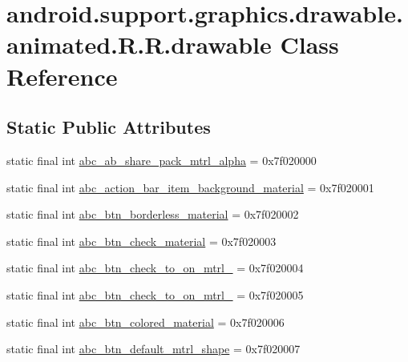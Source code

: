 \hypertarget{classandroid_1_1support_1_1graphics_1_1drawable_1_1animated_1_1_r_1_1drawable}{
\section{android.support.graphics.drawable.animated.R.R.drawable Class Reference}
\label{classandroid_1_1support_1_1graphics_1_1drawable_1_1animated_1_1_r_1_1drawable}
}
\subsection*{Static Public Attributes}
\begin{CompactItemize}
\item 
static final int \hyperlink{classandroid_1_1support_1_1graphics_1_1drawable_1_1animated_1_1_r_1_1drawable_05d8125d7b1434895dd1d589215a8d37}{abc\_\-ab\_\-share\_\-pack\_\-mtrl\_\-alpha} = 0x7f020000
\item 
static final int \hyperlink{classandroid_1_1support_1_1graphics_1_1drawable_1_1animated_1_1_r_1_1drawable_e00a2e7bcb2b10d7ad898217cd821020}{abc\_\-action\_\-bar\_\-item\_\-background\_\-material} = 0x7f020001
\item 
static final int \hyperlink{classandroid_1_1support_1_1graphics_1_1drawable_1_1animated_1_1_r_1_1drawable_3c31666387fd30b884066c7438704a57}{abc\_\-btn\_\-borderless\_\-material} = 0x7f020002
\item 
static final int \hyperlink{classandroid_1_1support_1_1graphics_1_1drawable_1_1animated_1_1_r_1_1drawable_a2ed7e9f1f93dc58085bca69a4f4af04}{abc\_\-btn\_\-check\_\-material} = 0x7f020003
\item 
static final int \hyperlink{classandroid_1_1support_1_1graphics_1_1drawable_1_1animated_1_1_r_1_1drawable_6df0b47b49a7490efaddda318f346f6d}{abc\_\-btn\_\-check\_\-to\_\-on\_\-mtrl\_} = 0x7f020004
\item 
static final int \hyperlink{classandroid_1_1support_1_1graphics_1_1drawable_1_1animated_1_1_r_1_1drawable_58b89ad8b611c25a8b648588eec75c5d}{abc\_\-btn\_\-check\_\-to\_\-on\_\-mtrl\_} = 0x7f020005
\item 
static final int \hyperlink{classandroid_1_1support_1_1graphics_1_1drawable_1_1animated_1_1_r_1_1drawable_284fbc7aeaf20a0a9d0f410949bb1fef}{abc\_\-btn\_\-colored\_\-material} = 0x7f020006
\item 
static final int \hyperlink{classandroid_1_1support_1_1graphics_1_1drawable_1_1animated_1_1_r_1_1drawable_3b260e6cffca277730e4ad11cf63579b}{abc\_\-btn\_\-default\_\-mtrl\_\-shape} = 0x7f020007

\end{CompactItemize}

